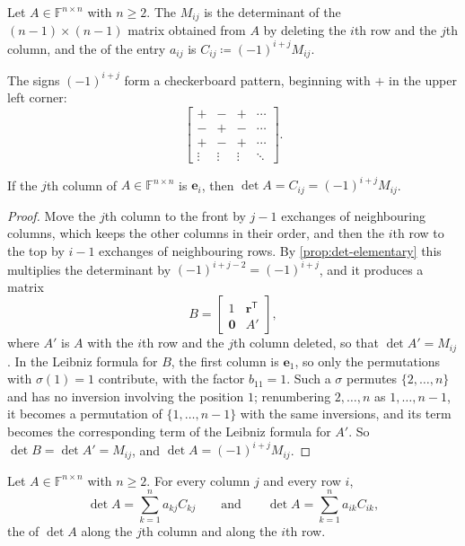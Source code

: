 \begin{definition}
\label{def:cofactor}
Let $A\in\mathbb F^{n\times n}$ with $n\ge2$. The  $M_{ij}$ is the determinant of the $(n-1)\times(n-1)$ matrix obtained from $A$ by deleting the $i$th row and the $j$th column, and the  of the entry $a_{ij}$ is $C_{ij}\coloneqq(-1)^{i+j}M_{ij}$.
\end{definition}

The signs $(-1)^{i+j}$ form a checkerboard pattern, beginning with $+$ in the upper left corner:
\[
\begin{bmatrix}+&-&+&\cdots\\-&+&-&\cdots\\+&-&+&\cdots\\\vdots&\vdots&\vdots&\ddots\end{bmatrix}.
\]

\begin{lemma}
\label{lem:unit-column}
If the $j$th column of $A\in\mathbb F^{n\times n}$ is $\mathbf e_i$, then $\det A=C_{ij}=(-1)^{i+j}M_{ij}$.
\end{lemma}

\begin{proof}
Move the $j$th column to the front by $j-1$ exchanges of neighbouring columns, which keeps the other columns in their order, and then the $i$th row to the top by $i-1$ exchanges of neighbouring rows. By \cref{prop:det-elementary} this multiplies the determinant by $(-1)^{i+j-2}=(-1)^{i+j}$, and it produces a matrix
\[
B=\begin{bmatrix}1&\mathbf r^{\mathsf T}\\\mathbf 0&A'\end{bmatrix},
\]
where $A'$ is $A$ with the $i$th row and the $j$th column deleted, so that $\det A'=M_{ij}$. In the Leibniz formula for $B$, the first column is $\mathbf e_1$, so only the permutations with $\sigma(1)=1$ contribute, with the factor $b_{11}=1$. Such a $\sigma$ permutes $\{2,\ldots,n\}$ and has no inversion involving the position $1$; renumbering $2,\ldots,n$ as $1,\ldots,n-1$, it becomes a permutation of $\{1,\ldots,n-1\}$ with the same inversions, and its term becomes the corresponding term of the Leibniz formula for $A'$. So $\det B=\det A'=M_{ij}$, and $\det A=(-1)^{i+j}M_{ij}$.
\end{proof}

\begin{theorem}
\label{thm:laplace-expansion}
Let $A\in\mathbb F^{n\times n}$ with $n\ge2$. For every column $j$ and every row $i$,
\[
\det A=\sum_{k=1}^na_{kj}C_{kj}\qquad\text{and}\qquad\det A=\sum_{k=1}^na_{ik}C_{ik},
\]
the  of $\det A$ along the $j$th column and along the $i$th row.
\end{theorem}

